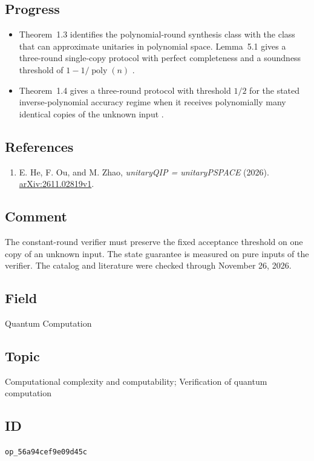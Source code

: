 \subsection*{Progress}

\begin{itemize}
  \item Theorem~1.3 identifies the polynomial-round synthesis class with the class that can approximate unitaries in polynomial space. Lemma~5.1 gives a three-round single-copy protocol with perfect completeness and a soundness threshold of $1-1/\operatorname{poly}(n)$ .

  \item Theorem~1.4 gives a three-round protocol with threshold $1/2$ for the stated inverse-polynomial accuracy regime when it receives polynomially many identical copies of the unknown input .
\end{itemize}

\subsection*{References}

\begin{enumerate}[label={},leftmargin=4.8em,labelsep=0.5em]
  \footnotesize
  \item[\textup{[HOZ26]}]\label{ref:d11-interactive-unitary}
  E. He, F. Ou, and M. Zhao, \emph{unitaryQIP = unitaryPSPACE} (2026). \href{https://arxiv.org/abs/2611.02819v1}{arXiv:2611.02819v1}.
\end{enumerate}

\subsection*{Comment}

The constant-round verifier must preserve the fixed acceptance threshold on one copy of an unknown input. The state guarantee is measured on pure inputs of the verifier. The catalog and literature were checked through November 26, 2026.

\subsection*{Field}

Quantum Computation

\subsection*{Topic}

Computational complexity and computability; Verification of quantum computation

\subsection*{ID}

\texttt{op\_56a94cef9e09d45c}
